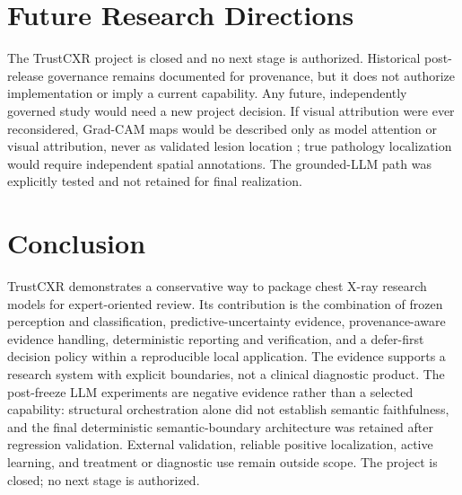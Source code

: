 \documentclass[10pt,a4paper,twocolumn]{article}
\begin{document}
\section{Future Research Directions}
The TrustCXR project is closed and no next stage is authorized. Historical
post-release governance remains documented for provenance, but it does not
authorize implementation or imply a current capability. Any future,
independently governed study would need a new project decision. If visual
attribution were ever reconsidered, Grad-CAM maps would be described only as
model attention or visual attribution, never as validated lesion location
\citep{selvaraju2017gradcam}; true pathology localization would require
independent spatial annotations. The grounded-LLM path was explicitly tested
and not retained for final realization.

\section{Conclusion}
TrustCXR demonstrates a conservative way to package chest X-ray research models for expert-oriented review. Its contribution is the combination of frozen perception and classification, predictive-uncertainty evidence, provenance-aware evidence handling, deterministic reporting and verification, and a defer-first decision policy within a reproducible local application. The evidence supports a research system with explicit boundaries, not a clinical diagnostic product. The post-freeze LLM experiments are negative evidence rather than a selected capability: structural orchestration alone did not establish semantic faithfulness, and the final deterministic semantic-boundary architecture was retained after regression validation. External validation, reliable positive localization, active learning, and treatment or diagnostic use remain outside scope. The project is closed; no next stage is authorized.
\end{document}
